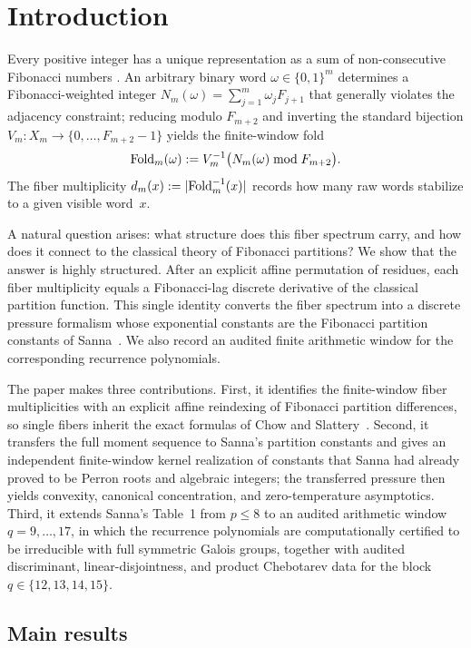 \section{Introduction}\label{sec:introduction}

Every positive integer has a unique representation as a sum of
non-consecutive Fibonacci numbers \cite{Lekkerkerker1952,Zeckendorf1972}.
An arbitrary binary word $\omega\in\{0,1\}^m$ determines a Fibonacci-weighted
integer $N_m(\omega)=\sum_{j=1}^m\omega_jF_{j+1}$ that generally violates the
adjacency constraint; reducing modulo $F_{m+2}$ and inverting the standard
bijection $V_m\colon X_m\to\{0,\dots,F_{m+2}-1\}$ yields the finite-window
fold
\[
  \mathrm{Fold}_m(\omega):=V_m^{-1}\bigl(N_m(\omega)\bmod F_{m+2}\bigr).
\]
The fiber multiplicity $d_m(x):=|\mathrm{Fold}_m^{-1}(x)|$ records how many raw words
stabilize to a given visible word~$x$.

A natural question arises: what structure does this fiber spectrum carry, and
how does it connect to the classical theory of Fibonacci partitions?  We show
that the answer is highly structured.  After an explicit affine permutation
of residues, each fiber multiplicity equals a Fibonacci-lag discrete
derivative of the classical partition function.  This single identity converts
the fiber spectrum into a discrete pressure formalism whose exponential
constants are the Fibonacci partition constants of Sanna~\cite{Sanna2025}.  We
also record an audited finite arithmetic window for the corresponding
recurrence polynomials.

The paper makes three contributions.  First, it identifies the finite-window
fiber multiplicities with an explicit affine reindexing of Fibonacci partition
differences, so single fibers inherit the exact formulas of Chow and
Slattery~\cite{ChowSlattery2021}.  Second, it transfers the full moment
sequence to Sanna's partition constants and gives an independent
finite-window kernel realization of constants that Sanna had already proved
to be Perron roots and algebraic integers; the transferred pressure then
yields convexity, canonical concentration, and zero-temperature asymptotics.
Third, it extends Sanna's Table~1 from \(p\le 8\) to an audited arithmetic
window \(q=9,\dots,17\), in which the recurrence polynomials are
computationally certified to be irreducible with full symmetric Galois groups,
together with audited discriminant, linear-disjointness, and product
Chebotarev data for the block \(q\in\{12,13,14,15\}\).

\subsection{Main results}

